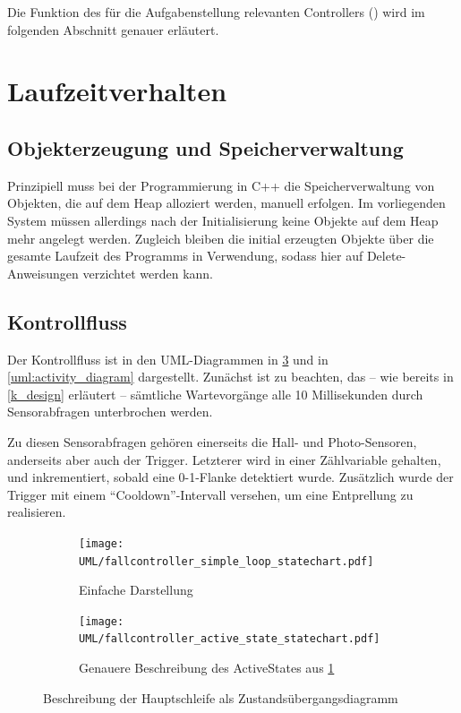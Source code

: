 Die Funktion des für die Aufgabenstellung relevanten Controllers () wird im folgenden Abschnitt genauer erläutert.

\section{Laufzeitverhalten}
\subsection{Objekterzeugung und Speicherverwaltung}
Prinzipiell muss bei der Programmierung in C++ die Speicherverwaltung von Objekten, die auf dem Heap alloziert werden, manuell erfolgen.
Im vorliegenden System müssen allerdings nach der Initialisierung keine Objekte auf dem Heap mehr angelegt werden.
Zugleich bleiben die initial erzeugten Objekte über die gesamte Laufzeit des Programms in Verwendung, sodass hier auf Delete-Anweisungen verzichtet werden kann.

\subsection{Kontrollfluss}
Der Kontrollfluss ist in den UML-Diagrammen in \cref{uml:statechart} und in \cref{uml:activity_diagram} dargestellt.
Zunächst ist zu beachten, das -- wie bereits in \cref{k_design} erläutert -- sämtliche Wartevorgänge alle 10 Millisekunden durch Sensorabfragen unterbrochen werden.

Zu diesen Sensorabfragen gehören einerseits die Hall- und Photo-Sensoren, anderseits aber auch der Trigger.
Letzterer wird in einer Zählvariable gehalten, und inkrementiert, sobald eine 0-1-Flanke detektiert wurde.
Zusätzlich wurde der Trigger mit einem \enquote{Cooldown}-Intervall versehen, um eine Entprellung zu realisieren.

\begin{figure}[htb!] \centering
	\begin{subfigure}[b]{0.4\textwidth}
		\texttt{[image: UML/fallcontroller\_simple\_loop\_statechart.pdf]}
		\caption{Einfache Darstellung}
		\label{uml:statechart_simleloop}
	\end{subfigure}\hspace{1cm}
	\begin{subfigure}[b]{0.4\textwidth}
 		\texttt{[image: UML/fallcontroller\_active\_state\_statechart.pdf]}
		\caption{Genauere Beschreibung des ActiveStates aus \ref{uml:statechart_simleloop}}
		\label{uml:statechart_activeState}
	\end{subfigure}
	\caption{Beschreibung der Hauptschleife als Zustandsübergangsdiagramm}
	\label{uml:statechart}
\end{figure}

